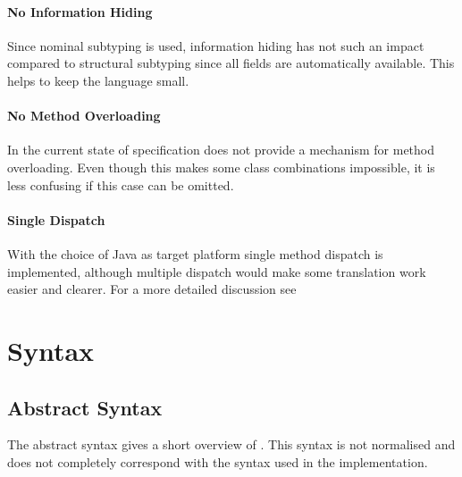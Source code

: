 \paragraph{No Information Hiding}
Since nominal subtyping is used, information hiding has not such an impact
compared to structural subtyping since all fields are automatically
available. This helps to keep the language small.

\paragraph{No Method Overloading}
In the current state of specification \ooplss does not provide a mechanism
for method overloading. Even though this makes some class combinations impossible,
it is less confusing if this case can be omitted.

\paragraph{Single Dispatch}
With the choice of Java as target platform single method dispatch is
implemented, although multiple dispatch would make some translation work
easier and clearer. For a more detailed discussion see 

\section{Syntax}
\subsection{Abstract Syntax}
The abstract syntax gives a short overview of \ooplss. This syntax is
not normalised and does not completely correspond with the syntax used
in the implementation.

